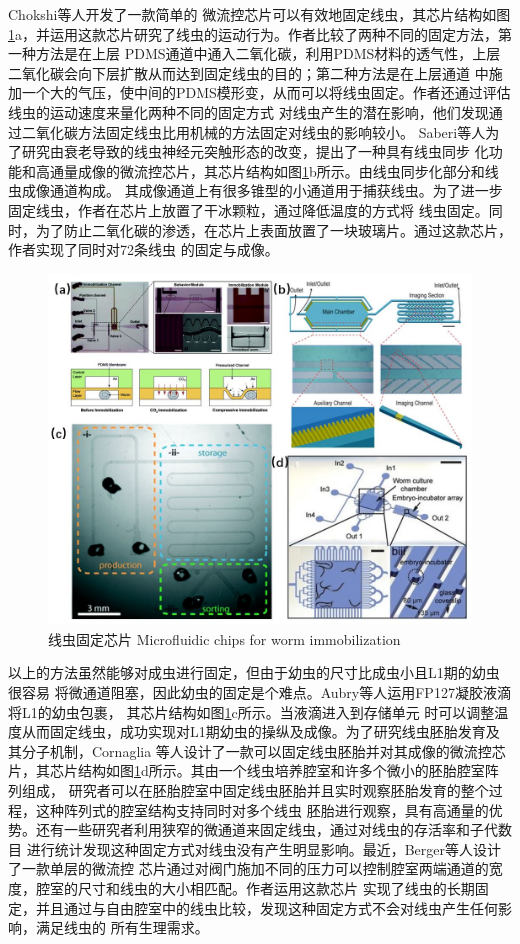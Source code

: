 	Chokshi等人\cite{Chokshi2009CO2}开发了一款简单的
	微流控芯片可以有效地固定线虫，其芯片结构如图\ref{fig:immobilization}a，并运用这款芯片研究了线虫的运动行为。作者比较了两种不同的固定方法，第一种方法是在上层
	PDMS通道中通入二氧化碳，利用PDMS材料的透气性，上层二氧化碳会向下层扩散从而达到固定线虫的目的；第二种方法是在上层通道
	中施加一个大的气压，使中间的PDMS模形变，从而可以将线虫固定。作者还通过评估线虫的运动速度来量化两种不同的固定方式
	对线虫产生的潜在影响，他们发现通过二氧化碳方法固定线虫比用机械的方法固定对线虫的影响较小。
	Saberi等人\cite{saberi2018microfluidic}为了研究由衰老导致的线虫神经元突触形态的改变，提出了一种具有线虫同步
	化功能和高通量成像的微流控芯片，其芯片结构如图\ref{fig:immobilization}b所示。由线虫同步化部分和线虫成像通道构成。
	其成像通道上有很多锥型的小通道用于捕获线虫。为了进一步固定线虫，作者在芯片上放置了干冰颗粒，通过降低温度的方式将
	线虫固定。同时，为了防止二氧化碳的渗透，在芯片上表面放置了一块玻璃片。通过这款芯片，作者实现了同时对72条线虫
	的固定与成像。
	\begin{figure}[t]
	  \centering
	  \includegraphics[width=12cm]{figure/chap1/immobilization.jpg}
	  \bicaption
		{线虫固定芯片}
		{Microfluidic chips for worm immobilization}
	  \label{fig:immobilization}
	\end{figure}
	
	以上的方法虽然能够对成虫进行固定，但由于幼虫的尺寸比成虫小且L1期的幼虫很容易
	将微通道阻塞，因此幼虫的固定是个难点。Aubry等人\cite{Aubry2015Hydrogel}运用FP127凝胶液滴将L1的幼虫包裹，
	其芯片结构如图\ref{fig:immobilization}c所示。当液滴进入到存储单元
	时可以调整温度从而固定线虫，成功实现对L1期幼虫的操纵及成像。为了研究线虫胚胎发育及其分子机制，Cornaglia
	等人\cite{Cornaglia2015An}设计了一款可以固定线虫胚胎并对其成像的微流控芯片，其芯片结构如图\ref{fig:immobilization}d所示。其由一个线虫培养腔室和许多个微小的胚胎腔室阵列组成，
	研究者可以在胚胎腔室中固定线虫胚胎并且实时观察胚胎发育的整个过程，这种阵列式的腔室结构支持同时对多个线虫
	胚胎进行观察，具有高通量的优势。还有一些研究者利用狭窄的微通道来固定线虫\cite{Lee2014A,Hulme2007A}，通过对线虫的存活率和子代数目
	进行统计发现这种固定方式对线虫没有产生明显影响。最近，Berger等人\cite{berger2018long}设计了一款单层的微流控
	芯片通过对阀门施加不同的压力可以控制腔室两端通道的宽度，腔室的尺寸和线虫的大小相匹配。作者运用这款芯片
	实现了线虫的长期固定，并且通过与自由腔室中的线虫比较，发现这种固定方式不会对线虫产生任何影响，满足线虫的
	所有生理需求。
